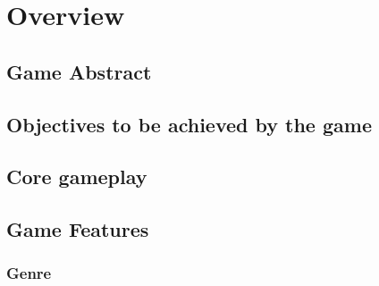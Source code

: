 \section{Overview}

\subsection{Game Abstract}

\subsection{Objectives to be achieved by the game}

\subsection{Core gameplay}

\subsection{Game Features}

\subsubsection{Genre}

